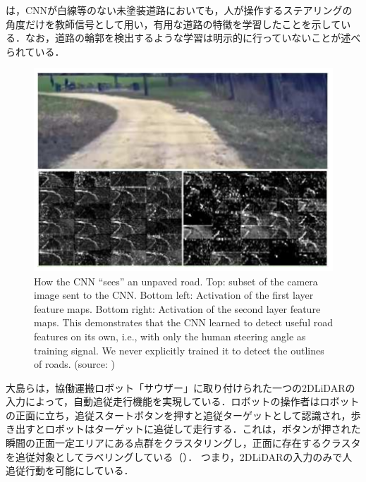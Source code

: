 \newpage

     は，CNNが白線等のない未塗装道路においても，人が操作するステアリングの角度だけを教師信号として用い，有用な道路の特徴を学習したことを示している．なお，道路の輪郭を検出するような学習は明示的に行っていないことが述べられている．

     \vspace{2cm}

     \begin{figure}[h]
          \centering
          \includegraphics[keepaspectratio, scale=0.80] {images/pdf/bojarski_CNN}
          \captionsetup{justification=raggedright} %
          \caption[How the CNN ``sees'' an unpaved road. Top: subset of the camera image sent to the CNN. Bottom left: Activation of the first layer feature maps. Bottom right: Activation of the second layer feature maps. This demonstrates that the CNN learned to detect useful road features on its own, i.e., with only the human steering angle as training signal. We never explicitly trained it to detect the outlines of roads.]{How the CNN ``sees'' an unpaved road. Top: subset of the camera image sent to the CNN. Bottom left: Activation of the first layer feature maps. Bottom right: Activation of the second layer feature maps. This demonstrates that the CNN learned to detect useful road features on its own, i.e., with only the human steering angle as training signal. We never explicitly trained it to detect the outlines of roads. (source: \cite{bojarski})}
          \label{Fig:bojarski_CNN}
     \end{figure}

\newpage

     大島ら\cite{doog}は，協働運搬ロボット「サウザー」に取り付けられた一つの2DLiDARの入力によって，自動追従走行機能を実現している．ロボットの操作者はロボットの正面に立ち，追従スタートボタンを押すと追従ターゲットとして認識され，歩き出すとロボットはターゲットに追従して走行する．これは，ボタンが押された瞬間の正面一定エリアにある点群をクラスタリングし，正面に存在するクラスタを追従対象としてラベリングしている（）．
     つまり，2DLiDARの入力のみで人追従行動を可能にしている．

